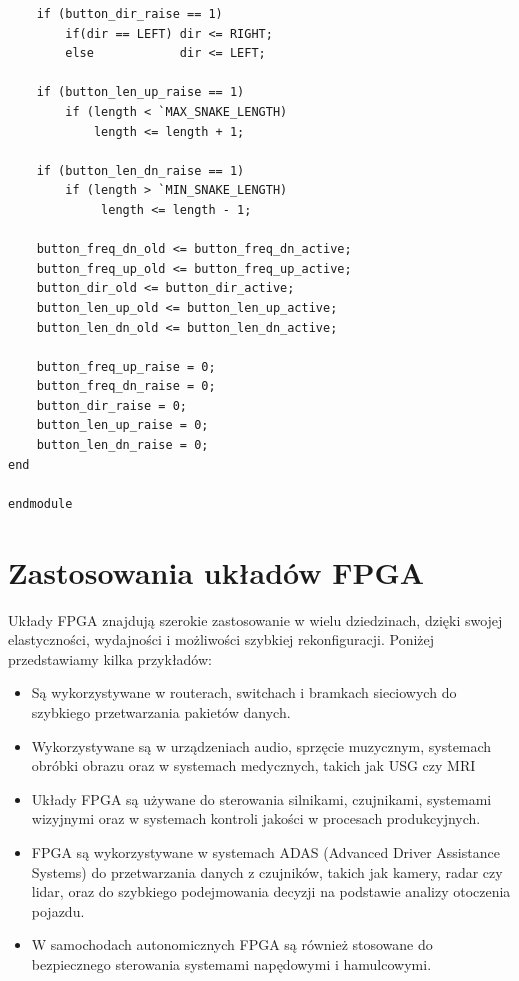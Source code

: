 \documentclass[a4paper]{article}
\begin{document}
\begin{verbatim}
    if (button_dir_raise == 1)
        if(dir == LEFT) dir <= RIGHT;
        else            dir <= LEFT;
    
    if (button_len_up_raise == 1)
        if (length < `MAX_SNAKE_LENGTH) 
            length <= length + 1;
            
    if (button_len_dn_raise == 1)
        if (length > `MIN_SNAKE_LENGTH) 
             length <= length - 1;
        
    button_freq_dn_old <= button_freq_dn_active;
    button_freq_up_old <= button_freq_up_active;
    button_dir_old <= button_dir_active;
    button_len_up_old <= button_len_up_active;
    button_len_dn_old <= button_len_dn_active;
        
    button_freq_up_raise = 0;
    button_freq_dn_raise = 0;
    button_dir_raise = 0;
    button_len_up_raise = 0;
    button_len_dn_raise = 0;
end

endmodule
\end{verbatim}

\pagebreak
\section{Zastosowania układów FPGA}
Układy FPGA znajdują szerokie zastosowanie w wielu dziedzinach,
dzięki swojej elastyczności, wydajności i możliwości szybkiej rekonfiguracji.
Poniżej przedstawiamy kilka przykładów:

\begin{itemize}
    \item Są wykorzystywane w routerach, switchach i bramkach sieciowych do szybkiego przetwarzania pakietów danych.
    \item Wykorzystywane są w urządzeniach audio, sprzęcie muzycznym, systemach obróbki obrazu oraz w systemach medycznych, takich jak USG czy MRI
    \item Układy FPGA są używane do sterowania silnikami, czujnikami, systemami wizyjnymi oraz w systemach kontroli jakości w procesach produkcyjnych.
    \item FPGA są wykorzystywane w systemach ADAS (Advanced Driver Assistance Systems) do przetwarzania danych z czujników, takich jak kamery, radar czy lidar, 
    oraz do szybkiego podejmowania decyzji na podstawie analizy otoczenia pojazdu.
    \item W samochodach autonomicznych FPGA są również stosowane do bezpiecznego sterowania systemami napędowymi i hamulcowymi.
\end{itemize}
\end{document}
